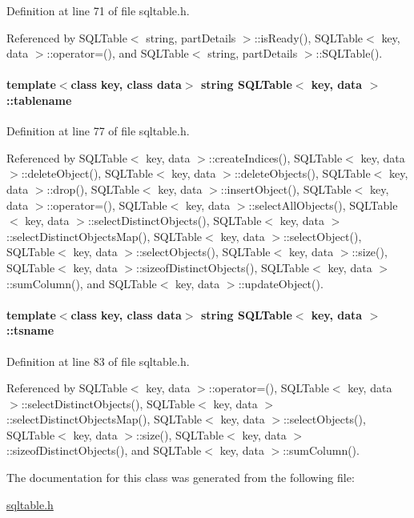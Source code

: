 Definition at line 71 of file sqltable.h.

Referenced by SQLTable$<$ string, part\-Details $>$::is\-Ready(), SQLTable$<$ key, data $>$::operator=(), and SQLTable$<$ string, part\-Details $>$::SQLTable().\hypertarget{classSQLTable_SQLTableo2}{
\paragraph[tablename]{\setlength{\rightskip}{0pt plus 5cm}template$<$class key, class data$>$ string SQLTable$<$ key, data $>$::tablename}\hfill}
\label{classSQLTable_SQLTableo2}




Definition at line 77 of file sqltable.h.

Referenced by SQLTable$<$ key, data $>$::create\-Indices(), SQLTable$<$ key, data $>$::delete\-Object(), SQLTable$<$ key, data $>$::delete\-Objects(), SQLTable$<$ key, data $>$::drop(), SQLTable$<$ key, data $>$::insert\-Object(), SQLTable$<$ key, data $>$::operator=(), SQLTable$<$ key, data $>$::select\-All\-Objects(), SQLTable$<$ key, data $>$::select\-Distinct\-Objects(), SQLTable$<$ key, data $>$::select\-Distinct\-Objects\-Map(), SQLTable$<$ key, data $>$::select\-Object(), SQLTable$<$ key, data $>$::select\-Objects(), SQLTable$<$ key, data $>$::size(), SQLTable$<$ key, data $>$::sizeof\-Distinct\-Objects(), SQLTable$<$ key, data $>$::sum\-Column(), and SQLTable$<$ key, data $>$::update\-Object().\hypertarget{classSQLTable_SQLTableo4}{
\paragraph[tsname]{\setlength{\rightskip}{0pt plus 5cm}template$<$class key, class data$>$ string SQLTable$<$ key, data $>$::tsname}\hfill}
\label{classSQLTable_SQLTableo4}




Definition at line 83 of file sqltable.h.

Referenced by SQLTable$<$ key, data $>$::operator=(), SQLTable$<$ key, data $>$::select\-Distinct\-Objects(), SQLTable$<$ key, data $>$::select\-Distinct\-Objects\-Map(), SQLTable$<$ key, data $>$::select\-Objects(), SQLTable$<$ key, data $>$::size(), SQLTable$<$ key, data $>$::sizeof\-Distinct\-Objects(), and SQLTable$<$ key, data $>$::sum\-Column().

The documentation for this class was generated from the following file:\begin{CompactItemize}
\item 
\hyperlink{sqltable_8h}{sqltable.h}\end{CompactItemize}
